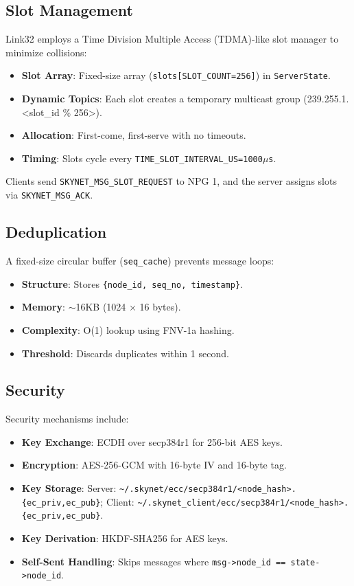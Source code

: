 \documentclass{article}
\begin{document}
\subsection{Slot Management}
Link32 employs a Time Division Multiple Access (TDMA)-like slot manager to minimize collisions:
\begin{itemize}
    \item \textbf{Slot Array}: Fixed-size array (\texttt{slots[SLOT\_COUNT=256]}) in \texttt{ServerState}.
    \item \textbf{Dynamic Topics}: Each slot creates a temporary multicast group (239.255.1.<slot\_id \% 256>).
    \item \textbf{Allocation}: First-come, first-serve with no timeouts.
    \item \textbf{Timing}: Slots cycle every \texttt{TIME\_SLOT\_INTERVAL\_US=1000$\mu$s}.
\end{itemize}
Clients send \texttt{SKYNET\_MSG\_SLOT\_REQUEST} to NPG 1, and the server assigns slots via \texttt{SKYNET\_MSG\_ACK}.

\subsection{Deduplication}
A fixed-size circular buffer (\texttt{seq\_cache}) prevents message loops:
\begin{itemize}
    \item \textbf{Structure}: Stores \texttt{\{node\_id, seq\_no, timestamp\}}.
    \item \textbf{Memory}: $\sim$16KB (1024 $\times$ 16 bytes).
    \item \textbf{Complexity}: O(1) lookup using FNV-1a hashing.
    \item \textbf{Threshold}: Discards duplicates within 1 second.
\end{itemize}

\subsection{Security}
\label{subsec:security}
Security mechanisms include:
\begin{itemize}
    \item \textbf{Key Exchange}: ECDH over secp384r1 for 256-bit AES keys.
    \item \textbf{Encryption}: AES-256-GCM with 16-byte IV and 16-byte tag.
    \item \textbf{Key Storage}: Server: \texttt{\textasciitilde/.skynet/ecc/secp384r1/<node\_hash>.\{ec\_priv,ec\_pub\}}; Client: \texttt{\textasciitilde/.skynet\_client/ecc/secp384r1/<node\_hash>.\{ec\_priv,ec\_pub\}}.
    \item \textbf{Key Derivation}: HKDF-SHA256 for AES keys.
    \item \textbf{Self-Sent Handling}: Skips messages where \texttt{msg->node\_id == state->node\_id}.
\end{itemize}
\end{document}
